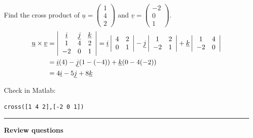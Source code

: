 \documentclass[12pt,letterpaper,noanswers]{exam}
\newcommand{\mb}[1]{\underline{#1}}
\begin{document}
Find the cross product of $\mb{u} = \left(\begin{array}{c} 1 \\ 4 \\ 2\end{array}\right)$ and $\mb{v} = \left(\begin{array}{c} -2 \\ 0 \\ 1\end{array}\right)$.
\begin{align*}
\mb{u}\times\mb{v} &= \left\vert\begin{array}{c c c} \mb{i} & \mb{j} & \mb{k} \\ 1 & 4 & 2 \\ -2 & 0 & 1 \end{array}\right\vert = \mb{i}\left\vert\begin{array}{c c} 4 & 2 \\ 0 & 1 \end{array}\right\vert-\mb{j}\left\vert\begin{array}{c c} 1 & 2 \\ -2 & 1 \end{array}\right\vert+\mb{k}\left\vert\begin{array}{c c} 1 & 4 \\ -2 & 0 \end{array}\right\vert \\
&= \mb{i}(4)-\mb{j}(1-(-4))+\mb{k}(0-4(-2)) \\
&= 4\mb{i}-5\mb{j}+8\mb{k}
\end{align*}

Check in Matlab:
\begin{lstlisting}
cross([1 4 2],[-2 0 1])
\end{lstlisting}









\vspace{0.2cm}
\hrule
\vspace{0.2cm}





\noindent\textbf{Review questions}
\end{document}
